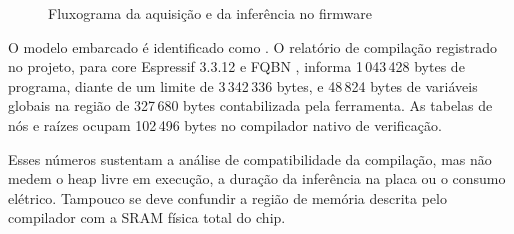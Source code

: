 \begin{figure}[p]
\centering
\caption{Fluxograma da aquisição e da inferência no firmware}
\label{fig:algoritmo}
\resizebox{0.94\textwidth}{!}{}
\end{figure}

O modelo embarcado é identificado como \modelversion. O relatório de
compilação registrado no projeto, para core Espressif 3.3.12 e
FQBN , informa
1\,043\,428 bytes de programa, diante de um limite de 3\,342\,336 bytes,
e 48\,824 bytes de variáveis globais na região de 327\,680 bytes
contabilizada pela ferramenta. As tabelas de nós e raízes ocupam
102\,496 bytes no compilador nativo de verificação.

Esses números sustentam a análise de compatibilidade da compilação,
mas não medem o heap livre em execução, a duração da inferência
na placa ou o consumo elétrico. Tampouco se deve confundir a região
de memória descrita pelo compilador com a SRAM física total do chip.
\FloatBarrier

